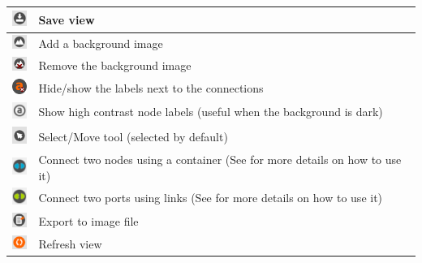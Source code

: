 \documentclass[a4paper]{article}
\begin{document}
		\begin{table}[h!]
			\centering
			\begin{tabular}[h!]{lp{10cm}}
				\includegraphics[width=0.5cm]{img/icon_save.png} & Save view\\
				\midrule
				\includegraphics[width=0.5cm]{img/icon_add_background.png} & Add a background image\\
				\midrule
				\includegraphics[width=0.5cm]{img/icon_remove_background.png} & Remove the background image\\
				\midrule
				\includegraphics[width=0.5cm]{img/icon_toggle_conn_labels.png} & Hide/show the labels next to the connections\\
				\midrule
				\includegraphics[width=0.5cm]{img/object_view_high_contrast.png} & Show high contrast node labels (useful when the background is dark)\\
				\midrule
				\includegraphics[width=0.5cm]{img/icon_select_tool.png} & Select/Move tool (selected by default)\\
				\midrule
				\includegraphics[width=0.5cm]{img/object_view_container.png} & Connect two nodes using a container (See \textbf{\nameref{sec:physical_connections}} for more details on how to use it)\\
				\midrule
				\includegraphics[width=0.5cm]{img/object_view_link.png} & Connect two ports using links (See \textbf{\nameref{sec:physical_connections}} for more details on how to use it)\\	
				\midrule
				\includegraphics[width=0.5cm]{img/icon_export.png} & Export to image file\\
				\midrule
				\includegraphics[width=0.5cm]{img/icon_refresh_view.png} & Refresh view\\			
			\end{tabular}
		\end{table}
		
\end{document}
